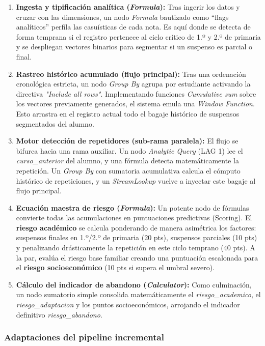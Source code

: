 \begin{enumerate}
    \item \textbf{Ingesta y tipificación analítica (\textit{Formula}):} Tras ingerir los datos y cruzar con las dimensiones, un nodo \textit{Formula} bautizado como ``flags analíticos'' perfila las casuísticas de cada nota. Es aquí donde se detecta de forma temprana si el registro pertenece al ciclo crítico de 1.º y 2.º de primaria y se despliegan vectores binarios para segmentar si un suspenso es parcial o final.
    \item \textbf{Rastreo histórico acumulado (flujo principal):} Tras una ordenación cronológica estricta, un nodo \textit{Group By} agrupa por estudiante activando la directiva \textit{"Include all rows"}. Implementando funciones \textit{Cumulative sum} sobre los vectores previamente generados, el sistema emula una \textit{Window Function}. Esto arrastra en el registro actual todo el bagaje histórico de suspensos segmentados del alumno.
    \item \textbf{Motor detección de repetidores (sub-rama paralela):} El flujo se bifurca hacia una rama auxiliar. Un nodo \textit{Analytic Query} (LAG 1) lee el \textit{curso\_anterior} del alumno, y una fórmula detecta matemáticamente la repetición. Un \textit{Group By} con sumatoria acumulativa calcula el cómputo histórico de repeticiones, y un \textit{StreamLookup} vuelve a inyectar este bagaje al flujo principal.
    \item \textbf{Ecuación maestra de riesgo (\textit{Formula}):} Un potente nodo de fórmulas convierte todas las acumulaciones en puntuaciones predictivas (Scoring). El \textbf{riesgo académico} se calcula ponderando de manera asimétrica los factores: suspensos finales en 1.º/2.º de primaria (20 pts), suspensos parciales (10 pts) y penalizando drásticamente la repetición en este ciclo temprano (40 pts). A la par, evalúa el riesgo base familiar creando una puntuación escalonada para el \textbf{riesgo socioeconómico} (10 pts si supera el umbral severo).
    \item \textbf{Cálculo del indicador de abandono (\textit{Calculator}):} Como culminación, un nodo sumatorio simple consolida matemáticamente el \textit{riesgo\_academico}, el \textit{riesgo\_adaptacion} y los puntos socioeconómicos, arrojando el indicador definitivo \textit{riesgo\_abandono}.
\end{enumerate}

\subsubsection{Adaptaciones del pipeline incremental}

